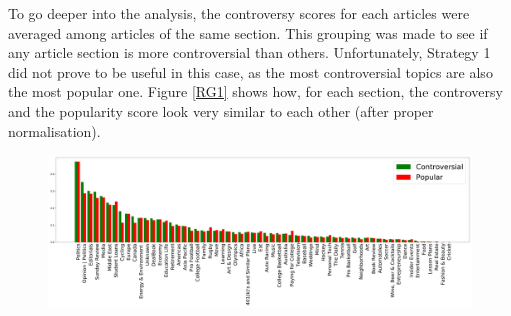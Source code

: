 To go deeper into the analysis, the controversy scores for each articles were averaged among articles of the same section. This grouping was made to see if any article section is more controversial than others. Unfortunately, Strategy 1 did not prove to be useful in this case, as the most controversial topics are also the most popular one. Figure \ref{RG1} shows how, for each section, the controversy and the popularity score look very similar to each other (after proper normalisation).

\begin{figure}
\centering
\includegraphics{Pictures/Strat1SN.pdf}
\end{figure}